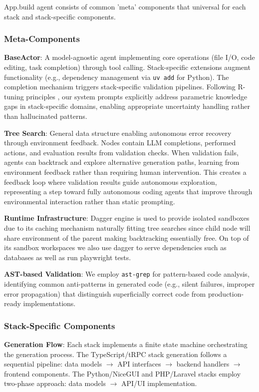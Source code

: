 \documentclass{article}
\begin{document}
App.build agent consists of common 'meta' components that universal for each stack and stack-specific components. 

\subsubsection{Meta-Components}

\textbf{BaseActor}: A model-agnostic agent implementing core operations (file I/O, code editing, task completion) through tool calling. Stack-specific extensions augment functionality (e.g., dependency management via \texttt{uv add} for Python). The completion mechanism triggers stack-specific validation pipelines. Following R-tuning principles \citep{zhang2023rtuning}, our system prompts explicitly address parametric knowledge gaps in stack-specific domains, enabling appropriate uncertainty handling rather than hallucinated patterns.

\textbf{Tree Search}: General data structure enabling autonomous error recovery through environment feedback. Nodes contain LLM completions, performed actions, and evaluation results from validation checks. When validation fails, agents can backtrack and explore alternative generation paths, learning from environment feedback rather than requiring human intervention. This creates a feedback loop where validation results guide autonomous exploration, representing a step toward fully autonomous coding agents that improve through environmental interaction rather than static prompting.

\textbf{Runtime Infrastructure}: Dagger engine is used to provide isolated sandboxes due to its caching mechanism naturally fitting tree searches since child node will share environment of the parent making backtracking essentially free. On top of its sandbox workspaces we also use dagger to serve dependencies such as databases as well as run playwright tests.

\textbf{AST-based Validation}: We employ \texttt{ast-grep} for pattern-based code analysis, identifying common anti-patterns in generated code (e.g., silent failures, improper error propagation) that distinguish superficially correct code from production-ready implementations.

\subsubsection{Stack-Specific Components}

\textbf{Generation Flow}: Each stack implements a finite state machine orchestrating the generation process. The TypeScript/tRPC stack generation follows a sequential pipeline: data models $\rightarrow$ API interfaces $\rightarrow$ backend handlers $\rightarrow$ frontend components. The Python/NiceGUI and PHP/Laravel stacks employ two-phase approach: data models $\rightarrow$ API/UI implementation.
\end{document}
